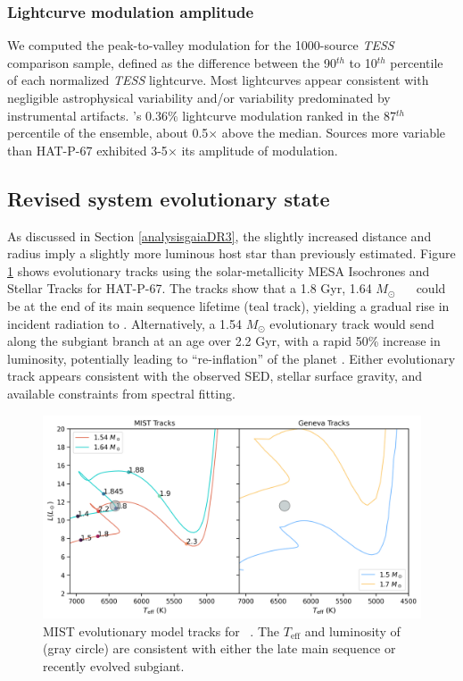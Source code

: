 \documentclass[twocolumn]{aastex631}
\newcommand{\hatp}{\object{HAT-P-67}~}
\newcommand{\hatpb}{\object{HAT-P-67 b}}
\begin{document}
\subsubsection{Lightcurve modulation amplitude}
We computed the peak-to-valley modulation for the 1000-source \emph{TESS} comparison sample, defined as the difference between the 90$^{th}$ to 10$^{th}$ percentile of each normalized \emph{TESS} lightcurve.  Most lightcurves appear consistent with negligible astrophysical variability and/or variability predominated by instrumental artifacts. 's 0.36$\%$ lightcurve modulation ranked in the 87$^{th}$ percentile of the ensemble, about 0.5$\times$ above the median.  Sources more variable than HAT-P-67 exhibited 3-5$\times$ its amplitude of modulation.




\subsection{Revised system evolutionary state}\label{secMISTtracks}
As discussed in Section \ref{analysisgaiaDR3}, the slightly increased distance and radius imply a slightly more luminous host star than previously estimated.  Figure \ref{fig:evolTracks} shows evolutionary tracks using the solar-metallicity MESA \citep{2011ApJS..192....3P,2013ApJS..208....4P,2015ApJS..220...15P} Isochrones and Stellar Tracks \citep[MIST;][]{2016ApJS..222....8D,2016ApJ...823..102C} for HAT-P-67.  The tracks show that a 1.8 Gyr, 1.64 $M_\odot$ \hatp~ could be at the end of its main sequence lifetime (teal track), yielding a gradual rise in incident radiation to \hatpb.  Alternatively, a 1.54 $M_\odot$ evolutionary track would send \hatp~ along the subgiant branch at an age over 2.2 Gyr, with a rapid 50\% increase in luminosity, potentially leading to ``re-inflation'' of the planet \citep{2021ApJ...909L..16T}.  Either evolutionary track appears consistent with the observed SED, stellar surface gravity, and available constraints from spectral fitting.

\begin{figure}
    \centering
    \includegraphics[width=0.7\linewidth]{figures/MIST_tracks_HATP.png}
    \caption{MIST evolutionary model tracks for \hatp.  The $T_\mathrm{eff}$ and luminosity of \hatp~ (gray circle) are consistent with either the late main sequence or recently evolved subgiant.}
    \label{fig:evolTracks}
\end{figure}
\end{document}
